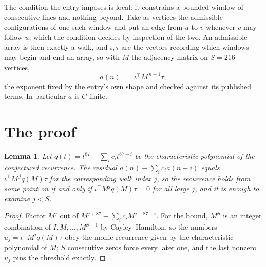 \documentclass[11pt,a4paper]{article}
\theoremstyle{plain}
\newtheorem{lemma}[theorem]{Lemma}
\theoremstyle{definition}
\begin{document}
The condition the entry imposes is local: it constrains a bounded window of consecutive lines and nothing beyond. Take as vertices the admissible configurations of one such window and put an edge from $u$ to $v$ whenever $v$ may follow $u$, which the condition decides by inspection of the two.
An admissible array is then exactly a walk, and $\iota,\tau$ are the vectors recording which windows may begin and end an array, so with $M$ the adjacency matrix on $S=216$ vertices,
\[
a(n)\;=\;\iota^{\!\top}M^{\,n-1}\tau ,
\]
the exponent fixed by the entry's own shape and checked against its published terms. In
particular $a$ is $C$-finite.

\section{The proof}

\begin{lemma}\label{lem:crit}
Let $q(t)=t^{87}-\sum_i c_it^{87-i}$ be the characteristic polynomial of the
conjectured recurrence. The residual $a(n)-\sum_ic_ia(n-i)$ equals
$\iota^{\!\top}M^{\,j}q(M)\tau$ for the corresponding walk index $j$, so the recurrence
holds from some point on if and only if $\iota^{\!\top}M^{j}q(M)\tau=0$ for all large $j$,
and it is enough to examine $j<S$.
\end{lemma}

\begin{proof}
Factor $M^{j}$ out of $M^{j+87}-\sum_ic_iM^{j+87-i}$. For the bound, $M^{S}$
is an integer combination of $I,M,\dots,M^{S-1}$ by Cayley--Hamilton, so the numbers
$u_j=\iota^{\!\top}M^{j}q(M)\tau$ obey the monic recurrence given by the characteristic
polynomial of $M$; $S$ consecutive zeros force every later one, and the last nonzero $u_j$
pins the threshold exactly.
\end{proof}
\end{document}
